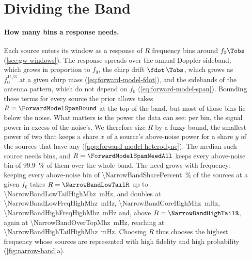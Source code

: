 \section{Dividing the Band}
\label{sec:narrow-band}

\paragraph{How many bins a response needs.}
\label{sec:narrow-band-span}
Each source enters its window as a response of $R$ frequency bins around $f_0\Tobs$
(\cref{sec:gw-windows}). The response spreads over the annual Doppler sideband, which grows in
proportion to $f_0$, the chirp drift $\fdot\,\Tobs$, which grows as $f_0^{11/3}$ at a given chirp
mass (\cref{eq:forward-model-fdot}), and the sidebands of the antenna pattern, which do not depend
on $f_0$ (\cref{eq:forward-model-span}). Bounding these terms for every source the prior allows
takes $R=\ForwardModelSpanBound$ at the top of the band, but most of those bins lie below the noise.
What matters is the power the data can see: per bin, the signal power in excess of the noise's. We
therefore size $R$ by a fuzzy bound, the smallest power of two that keeps a share $x$ of a source's
above-noise power for a share $y$ of the sources that have any (\cref{app:forward-model-heterodyne}).
The median such source needs \ForwardModelSpanMedian{} bins, and $R=\ForwardModelSpanNeedAll$ keeps
every above-noise bin of \qty{99.9}{\percent} of them over the whole band. The need grows with
frequency: keeping every above-noise bin of \qty{\NarrowBandSharePercent}{\percent} of the sources
at a given $f_0$ takes $R=\NarrowBandLowTailR$ up to \qty{\NarrowBandLowTailHighMhz}{\milli\hertz},
and doubles at \qty{\NarrowBandLowFreqHighMhz}{\milli\hertz}, \qty{\NarrowBandCoreHighMhz}{\milli\hertz},
\qty{\NarrowBandHighFreqHighMhz}{\milli\hertz} and, above $R=\NarrowBandHighTailR$, again at
\qty{\NarrowBandOverTopMhz}{\milli\hertz}, reaching \NarrowBandTopR{} at
\qty{\NarrowBandHighTailHighMhz}{\milli\hertz}. Choosing $R$ thus chooses the highest frequency whose
sources are represented with high fidelity and high probability (\cref{fig:narrow-band}a).

